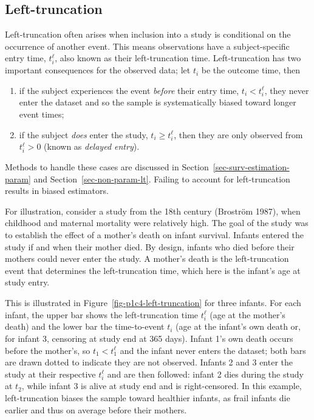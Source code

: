 \documentclass[
  letterpaper,
  krantz2]{style/krantz}
\providecommand{\tightlist}{%
  \setlength{\itemsep}{0pt}\setlength{\parskip}{0pt}}
\begin{document}
\subsection{Left-truncation}\label{sec-left-truncation}

Left-truncation often arises when inclusion into
a study is conditional on the occurrence of another event. This means
observations have a subject-specific entry time, \(t^\ell_i\), also
known as their left-truncation time. Left-truncation has two important
consequences for the observed data; let \(t_i\) be the outcome time,
then

\begin{enumerate}
\def\labelenumi{\arabic{enumi}.}
\tightlist
\item
  if the subject experiences the event \emph{before} their entry time,
  \(t_i < t^\ell_i\), they never enter the dataset and so the sample is
  systematically biased toward longer event times;
\item
  if the subject \emph{does} enter the study, \(t_i \ge t^\ell_i\), then
  they are only observed from \(t_i^\ell > 0\) (known as \emph{delayed
  entry}).
\end{enumerate}

Methods to handle these cases are discussed in
Section~\ref{sec-surv-estimation-param} and
Section~\ref{sec-non-param-lt}. Failing to account for left-truncation
results in biased estimators.

For illustration, consider a study from the 18th century (Broström
1987), when childhood and maternal mortality were relatively high. The
goal of the study was to establish the effect of a mother's death on
infant survival. Infants entered the study if and when their mother
died. By design, infants who died before their mothers could never enter
the study. A mother's death is the left-truncation event that determines
the left-truncation time, which here is the infant's age at study entry.

This is illustrated in Figure~\ref{fig-p1c4-left-truncation} for three
infants. For each infant, the upper bar shows the left-truncation time
\(t_i^\ell\) (age at the mother's death) and the lower bar the
time-to-event \(t_i\) (age at the infant's own death or, for infant 3,
censoring at study end at 365 days). Infant 1's own death occurs before
the mother's, so \(t_1 < t_1^\ell\) and the infant never enters the
dataset; both bars are drawn dotted to indicate they are not observed.
Infants 2 and 3 enter the study at their respective \(t_i^\ell\) and are
then followed: infant 2 dies during the study at \(t_2\), while infant 3
is alive at study end and is right-censored. In this example,
left-truncation biases the sample toward healthier infants, as frail
infants die earlier and thus on average before their mothers.
\end{document}
